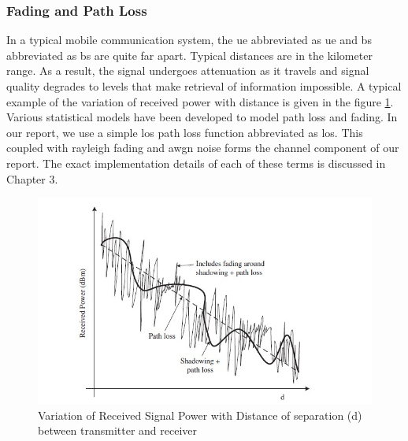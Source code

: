 \subsubsection{Fading and Path Loss}
In a typical mobile communication system, the \acrlong{ue} abbreviated as \acrshort{ue} and \acrlong{bs} abbreviated as \acrshort{bs} are quite far apart. Typical distances are in the kilometer range. As a result, the signal undergoes attenuation as it travels and signal quality degrades to levels that make retrieval of information impossible. A typical example of the variation of received power with distance is given in the figure \ref{fig:path loss}.\\
Various statistical models have been developed to model path loss and fading. In our report, we use a simple \acrlong{los} path loss function abbreviated as \acrshort{los}. This coupled with \gls{rayleigh fading} and \acrshort{awgn} noise forms the channel component of our report. The exact implementation details of each of these terms is discussed in Chapter 3.  
\begin{figure}[!htbp]
\centering
\includegraphics[scale=1]{Chapter 2/Figures/Path Loss}
\caption[Signal Degradation due to Path Loss and Fading]{Variation of Received Signal Power with Distance of separation (d) between transmitter and receiver}
\label{fig:path loss}
\end{figure}
